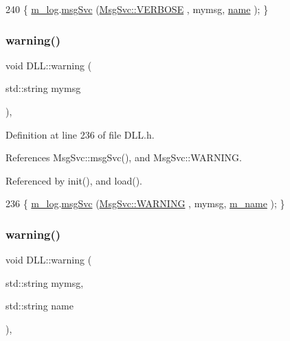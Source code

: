 \begin{DoxyCode}
240 \{ \hyperlink{classDLL_a6e66cd993e2d142b48691557ce8e4047}{m\_log}.\hyperlink{classMsgSvc_ad25f18047920cc59a314e5098259711c}{msgSvc} (\hyperlink{classMsgSvc_ae671eb7301996cd049d2da8a65925926af655256b06494ade5ba830abe5401ec9}{MsgSvc::VERBOSE} , mymsg, \hyperlink{classDLL_a0a915d538771dde2cb0580cd340ee088}{name} ); \}
\end{DoxyCode}
\mbox{\label{classDLL_a4bbc341bad623eedb5c228c91ce2e858}} 
\subsubsection{\texorpdfstring{warning()}{warning()}\hspace{0.1cm}{\footnotesize\ttfamily [1/2]}}
{\footnotesize\ttfamily void D\+L\+L\+::warning (\begin{DoxyParamCaption}\item[{std\+::string}]{mymsg }\end{DoxyParamCaption})\hspace{0.3cm}{\ttfamily [inline]}, {\ttfamily [private]}}



Definition at line 236 of file D\+L\+L.\+h.



References Msg\+Svc\+::msg\+Svc(), and Msg\+Svc\+::\+W\+A\+R\+N\+I\+NG.



Referenced by init(), and load().


\begin{DoxyCode}
236 \{ \hyperlink{classDLL_a6e66cd993e2d142b48691557ce8e4047}{m\_log}.\hyperlink{classMsgSvc_ad25f18047920cc59a314e5098259711c}{msgSvc} (\hyperlink{classMsgSvc_ae671eb7301996cd049d2da8a65925926a7cefae88f2ba26b2b05b676a383c834b}{MsgSvc::WARNING} , mymsg, \hyperlink{classDLL_ad5e4d36d8c2575447f73acc2a703b405}{m\_name} ); \}
\end{DoxyCode}
\mbox{\label{classDLL_a0f7d876098d5dcd412989a3b2a5dadf3}} 
\subsubsection{\texorpdfstring{warning()}{warning()}\hspace{0.1cm}{\footnotesize\ttfamily [2/2]}}
{\footnotesize\ttfamily void D\+L\+L\+::warning (\begin{DoxyParamCaption}\item[{std\+::string}]{mymsg,  }\item[{std\+::string}]{name }\end{DoxyParamCaption})\hspace{0.3cm}{\ttfamily [inline]}, {\ttfamily [private]}}



